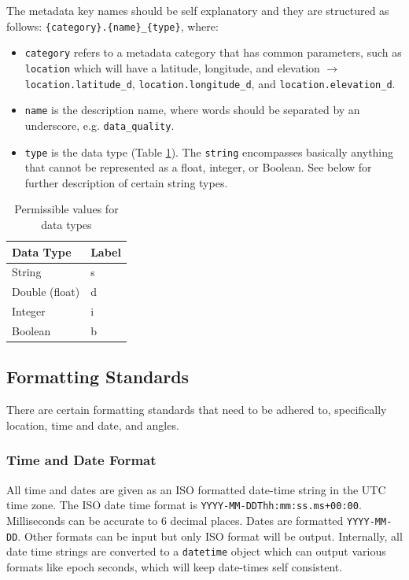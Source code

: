 \documentclass{article}
\begin{document}
The metadata key names should be self explanatory and they are structured as follows: \verb|{category}.{name}_{type}|, where:
\begin{itemize}
	\item \verb|category| refers to a metadata category that has common parameters, such as \verb|location| which will have a latitude, longitude, and elevation $\longrightarrow$ \verb|location.latitude_d|, \verb|location.longitude_d|, and \verb|location.elevation_d|.
	\item \verb|name| is the description name, where words should be separated by an underscore, e.g. \verb|data_quality|.
	\item \verb|type| is the data type (Table \ref{tab:types}). The \verb|string| encompasses basically anything that cannot be represented as a float, integer, or Boolean.  See below for further description of certain string types.    
\end{itemize}   

\begin{table}[htb!]
	\caption[Data types]{Permissible values for data types}
	\begin{tabular}{|l|l|}
		\hline
		\textbf{Data Type} & \textbf{Label} \\
		\hline
		String & s \\ \hline
		Double (float) & d \\ \hline
		Integer & i \\ \hline
		Boolean & b \\ \hline
	\end{tabular}
	\label{tab:types}
\end{table}

\subsection{Formatting Standards}

There are certain formatting standards that need to be adhered to, specifically location, time and date, and angles.

\subsubsection{Time and Date Format}

All time and dates are given as an ISO formatted date-time string in the UTC time zone.  The ISO date time format is \verb|YYYY-MM-DDThh:mm:ss.ms+00:00|.  Milliseconds can be accurate to 6 decimal places.  Dates are formatted \verb|YYYY-MM-DD|.  Other formats can be input but only ISO format will be output.  Internally, all date time strings are converted to a \verb|datetime| object which can output various formats like epoch seconds, which will keep date-times self consistent.
\end{document}
